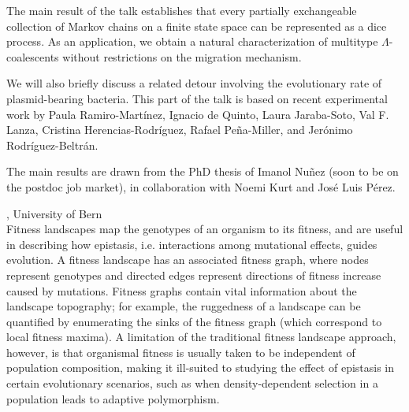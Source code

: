 \documentclass[12pt,a4paper]{article}
\begin{document}
 The main result of the talk establishes that every partially exchangeable collection of Markov chains on a finite state space can be represented as a dice process. As an application, we obtain a natural characterization of multitype $\Lambda$-coalescents without restrictions on the migration mechanism. 

 We will also briefly discuss a related detour involving the evolutionary rate of plasmid-bearing bacteria. This part of the talk is based on recent experimental work by Paula Ramiro-Martínez, Ignacio de Quinto, Laura Jaraba-Soto, Val F. Lanza, Cristina Herencias-Rodríguez, Rafael Peña-Miller, and Jerónimo Rodríguez-Beltrán. 

 The main results are drawn from the PhD thesis of Imanol Nuñez (soon to be on the postdoc job market), in collaboration with Noemi Kurt and José Luis Pérez. 

\bigskip\bigskip

, University of Bern \\[2ex] Fitness landscapes map the genotypes of an organism to its fitness, and are useful in describing how epistasis, i.e. interactions among mutational effects, guides evolution. A fitness landscape has an associated fitness graph, where nodes represent genotypes and directed edges represent directions of fitness increase caused by mutations. Fitness graphs contain vital information about the landscape topography; for example, the ruggedness of a landscape can be quantified by enumerating the sinks of the fitness graph (which correspond to local fitness maxima). A limitation of the traditional fitness landscape approach, however, is that organismal fitness is usually taken to be independent of population composition, making it ill-suited to studying the effect of epistasis in certain evolutionary scenarios, such as when density-dependent selection in a population leads to adaptive polymorphism.  
\end{document}
